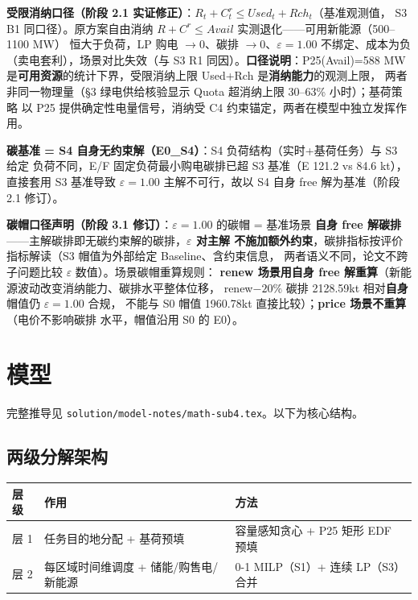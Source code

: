 \documentclass{internal-report}
\begin{document}
\textbf{受限消纳口径（阶段 2.1 实证修正）}：$R_t+C^r_t \le Used_t+Rch_t$（基准观测值，
S3 B1 同口径）。原方案自由消纳 $R+C^r\le Avail$ 实测退化——可用新能源（500--1100 MW）
恒大于负荷，LP 购电 $\to 0$、碳排 $\to 0$、$\varepsilon{=}1.00$ 不绑定、成本为负
（卖电套利），场景对比失效（与 S3 R1 同因）。\textbf{口径说明}：P25(Avail)=588 MW
是\textbf{可用资源}的统计下界，受限消纳上限 Used+Rch 是\textbf{消纳能力}的观测上限，
两者非同一物理量（§3 绿电供给核验显示 Quota 超消纳上限 30--63\% 小时）；基荷策略
以 P25 提供确定性电量信号，消纳受 C4 约束锚定，两者在模型中独立发挥作用。

\textbf{碳基准 = S4 自身无约束解（E0\_S4）}：S4 负荷结构（实时+基荷任务）与 S3 给定
负荷不同，E/F 固定负荷最小购电碳排已超 S3 基准（E 121.2 vs 84.6 kt），直接套用 S3
基准导致 $\varepsilon{=}1.00$ 主解不可行，故以 S4 自身 free 解为基准（阶段 2.1 修订）。

\textbf{碳帽口径声明（阶段 3.1 修订）}：$\varepsilon{=}1.00$ 的碳帽 = 基准场景
\textbf{自身 free 解碳排}——主解碳排即无碳约束解的碳排，\textbf{$\varepsilon$ 对主解
不施加额外约束}，碳排指标按评价指标解读（S3 帽值为外部给定 Baseline、含约束信息，
两者语义不同，论文不跨子问题比较 $\varepsilon$ 数值）。场景碳帽重算规则：
\textbf{renew 场景用自身 free 解重算}（新能源波动改变消纳能力、碳排水平整体位移，
renew$-20\%$ 碳排 2128.59kt 相对\textbf{自身}帽值仍 $\varepsilon{=}1.00$ 合规，
不能与 S0 帽值 1960.78kt 直接比较）；\textbf{price 场景不重算}（电价不影响碳排
水平，帽值沿用 S0 的 E0）。

\section{模型}

完整推导见 \texttt{solution/model-notes/math-sub4.tex}。以下为核心结构。

\subsection{两级分解架构}

\begin{center}
\footnotesize
\begin{tabular}{lll}
\toprule
层级 & 作用 & 方法 \\
\midrule
层 1 & 任务目的地分配 + 基荷预填 & 容量感知贪心 + P25 矩形 EDF 预填 \\
层 2 & 每区域时间维调度 + 储能/购售电/新能源 & 0-1 MILP（S1）+ 连续 LP（S3）合并 \\
\bottomrule
\end{tabular}
\end{center}
\end{document}
